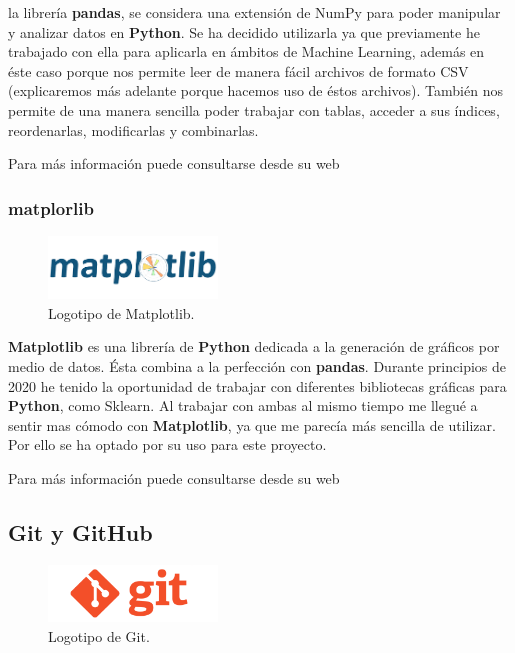la librería \textbf{pandas}, se considera una extensión de NumPy para poder manipular y analizar datos en \textbf{Python}. Se ha decidido utilizarla ya que previamente he trabajado con ella para aplicarla en ámbitos de Machine Learning, además en éste caso porque nos permite leer de manera fácil archivos de formato CSV (explicaremos más adelante porque hacemos uso de éstos archivos). También nos permite de una manera sencilla poder trabajar con tablas, acceder a sus índices, reordenarlas, modificarlas y combinarlas.

Para más información puede consultarse desde su web \cite{pandas}

\subsubsection{matplorlib}

\begin{figure}[H]
	\centering
	\includegraphics[width=0.4\textwidth]{img/matplotlib-icon}
	\caption{Logotipo de Matplotlib.}
\end{figure}

\textbf{Matplotlib} es una librería de \textbf{Python} dedicada a la generación de gráficos por medio de datos. Ésta combina a la perfección con \textbf{pandas}. Durante principios de 2020 he tenido la oportunidad de trabajar con diferentes bibliotecas gráficas para \textbf{Python}, como Sklearn. Al trabajar con ambas al mismo tiempo me llegué a sentir mas cómodo con \textbf{Matplotlib}, ya que me parecía más sencilla de utilizar. Por ello se ha optado por su uso para este proyecto.

Para más información puede consultarse desde su web \cite{matplotlib}

\subsection{Git y GitHub}

\begin{figure}[H]
	\centering
	\includegraphics[width=0.4\textwidth]{img/git-icon}
	\caption{Logotipo de Git.}
\end{figure}

